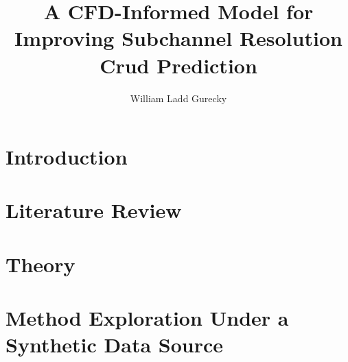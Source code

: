 \documentclass[12pt]{report}
\author{William Ladd Gurecky}
\title{ A CFD-Informed Model for Improving Subchannel Resolution Crud Prediction}
\newcommand{\hsp}{\hspace{20pt}}
\begin{document}
\copyrightpage          %
\commcertpage           %
\titlepage              %
	
\renewcommand{\thepage}{\roman{page}}






\pagebreak
\tableofcontents
\pagebreak



\titleformat{\chapter}[hang]{\Huge\bfseries}{\thechapter\hsp\textcolor{gray75}{|}\hsp}{0pt}{\Huge\bfseries}
\renewcommand{\thepage}{\arabic{page}} %
\setcounter{page}{1}
\doublespacing  %
\chapter{Introduction}
\label{chap:intro}


\chapter{Literature Review}
\label{chap:lit}


\chapter{Theory}
\label{chap:theory}


\chapter{Method Exploration Under a Synthetic Data Source}
\label{chap:work}


\end{document}
